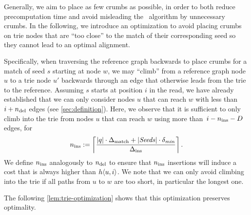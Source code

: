 
 \label{par:skip_crumbs}
%
Generally, we aim to place as few crumbs as possible, in order to both reduce
precomputation time and avoid misleading the \A~algorithm by unnecessary crumbs.
In the following, we introduce an optimization to avoid placing crumbs on trie
nodes that are ``too close'' to the match of their corresponding seed so they
cannot lead to an optimal alignment.

Specifically, when traversing the reference graph backwards to place crumbs for
a match of seed $s$ starting at node $w$, we may ``climb'' from a reference
graph node $u$ to a trie node $u'$ backwards through an edge that otherwise
leads from the trie to the reference.
%
Assuming $s$ starts at position $i$ in the read, we have already established
that we can only consider nodes $u$ that can reach $w$ with less than
$i+n_\text{del}$ edges (see \cref{sec:definition}).
%
Here, we observe that it is sufficient to only climb into the trie from nodes
$u$ that can reach $w$ using more than~$i-n_\text{ins}-D$ edges, for
\begin{align}
	n_\text{ins} := \left\lceil \frac{\lvert q \rvert \cdot \Delta_\text{match} + |\mathit{Seeds}| \cdot \delta_{\mathit{min}}}{\Delta_\text{ins}} \right\rceil.
\end{align}
%
We define $n_\text{ins}$ analogously to $n_\text{del}$ to ensure that $n_\text{ins}$ insertions
will induce a cost that is always higher than $h\langle u, i \rangle$. We note that we can
only avoid climbing into the trie if all paths from $u$ to $w$ are too short, in
particular the longest one.

The following \cref{lem:trie-optimization} shows that this optimization
preserves optimality.

